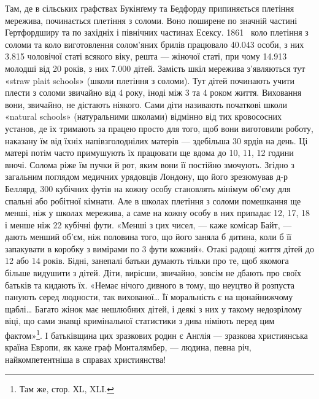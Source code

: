 Там, де в сільських графствах Букінґему та Бедфорду припиняється
плетіння мережива, починається плетіння з соломи. Воно
поширене по значній частині Гертфордширу та по західніх і північних
частинах Есексу. 1861~ коло плетіння з соломи та коло
виготовлення солом’яних брилів працювало \num{40.043} особи, з них
\num{3.815} чоловічої статі всякого віку, решта — жіночої статі, при
чому \num{14.913} молодші від 20 років, з них \num{7.000} дітей. Замість шкіл
мережива з’являються тут «straw plait schools» (школи плетіння
з соломи). Тут дітей починають учити плести з соломи звичайно
від 4 року, іноді між 3 та 4 роком життя. Виховання вони, звичайно,
не дістають ніякого. Сами діти називають початкові школи
«natural schools» (натуральними школами) відмінно від тих кровососних
установ, де їх тримають за працею просто для того, щоб
вони виготовили роботу, наказану їм від їхніх напівзголоднілих
матерів — здебільша 30 ярдів на день. Ці матері потім часто
примушують їх працювати ще вдома до 10, 11, 12 години вночі.
Солома ріже їм пучки й рот, яким вони її постійно змочують.
Згідно з загальним поглядом медичних урядовців Лондону, що
його зрезюмував д-р Беллярд, 300 кубічних футів на кожну
особу становлять мінімум об’єму для спальні або робітної
кімнати. Але в школах плетіння з соломи помешкання ще менші,
ніж у школах мережива, а саме на кожну особу в них припадає
12, 17, 18 і менше ніж 22 кубічні фути. «Менші з цих чисел, —
каже комісар Байт, — дають менший об’єм, ніж половина того,
що його заняла б дитина, коли б її запакувати в коробку з вимірами
по 3 фути кожний». Отакі радощі життя дітей до 12 або
14 років. Бідні, занепалі батьки думають тільки про те, щоб
якомога більше видушити з дітей. Діти, вирісши, звичайно,
зовсім не дбають про своїх батьків та кидають їх. «Немає нічого
дивного в тому, що неуцтво й розпуста панують серед людности,
так вихованої\dots{} Її моральність є на щонайнижчому щаблі\dots{} Багато
жінок має нешлюбних дітей, і деякі з них у такому недозрілому
віці, що сами знавці кримінальної статистики з дива німіють
перед цим фактом»\footnote{
Там же, стор. ХL, XLI.
}. І батьківщина цих зразкових родин є
Англія — зразкова християнська країна Европи, як каже граф
Монталямбер, — людина, певна річ, найкомпетентніша в справах
християнства!
